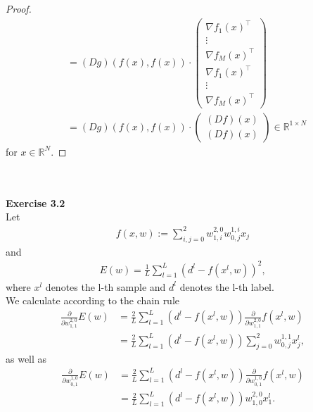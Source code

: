 \documentclass[a4paper, reqno]{amsart}
\newcommand{\R}{\mathbb R}
\theoremstyle{definition}
\numberwithin{equation}{section}
\begin{document}
\begin{proof}
\begin{align*}
			& = (Dg)(f(x), f(x)) \cdot \begin{pmatrix} 	\nabla f_1(x)^\top \\ \vdots \\ \nabla f_M(x)^\top \\ \nabla f_1(x)^\top \\ \vdots \\ \nabla f_M(x)^\top \end{pmatrix} \\
			& = (Dg)(f(x), f(x)) \cdot \begin{pmatrix} (Df)(x) \\ (Df)(x) \end{pmatrix} \in \R^{1\times N}
	\end{align*}
	for $x \in \R^N.$
\end{proof} ~\\ \\

{\bf Exercise 3.2} \\
Let 
\begin{align*}
f(x,w) := \sum\limits_{i,j = 0}^2 w_{1,i}^{2,0} w_{0,j}^{1,i} x_j
\end{align*} 
and
\begin{align*}
E(w) = \frac{1}{L} \sum\limits_{l=1}^L \left(d^l - f(x^l,w) \right)^2,
\end{align*}
where $x^l$ denotes the l-th sample and $d^l$ denotes the l-th label. \\
We calculate according to the chain rule
\begin{align*}
\frac{\partial}{\partial w_{1,1}^{2,0}} E(w) &= \frac{2}{L} \sum\limits_{l=1}^L \left( d^l - f(x^l,w) \right) \frac{\partial}{\partial w_{1,1}^{2,0}} f(x^l,w) \\
&= \frac{2}{L} \sum\limits_{l=1}^L \left( d^l - f(x^l,w) \right) \sum\limits_{j=0}^2 w_{0,j}^{1,1} x^l_j,
\end{align*}
as well as
\begin{align*}
\frac{\partial}{\partial w_{0,1}^{1,0}} E(w) &= \frac{2}{L} \sum\limits_{l=1}^L \left( d^l - f(x^l,w) \right) \frac{\partial}{\partial w_{0,1}^{1,0}} f(x^l,w) \\
&= \frac{2}{L} \sum\limits_{l=1}^L \left( d^l - f(x^l,w) \right) w_{1,0}^{2,0} x^l_1.
\end{align*}
\end{document}
